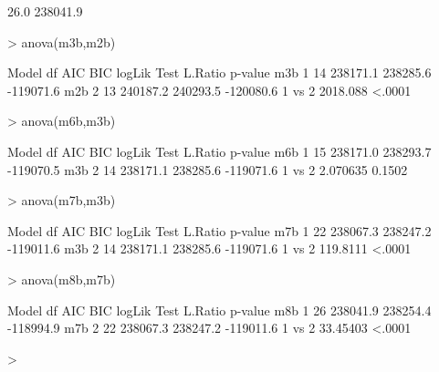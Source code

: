 \documentclass[11pt]{article}
\begin{document}
\begin{Schunk}
\begin{Soutput}
[1]     26.0 238041.9
\end{Soutput}
\begin{Sinput}
> anova(m3b,m2b)
\end{Sinput}
\begin{Soutput}
    Model df      AIC      BIC    logLik   Test  L.Ratio p-value
m3b     1 14 238171.1 238285.6 -119071.6                        
m2b     2 13 240187.2 240293.5 -120080.6 1 vs 2 2018.088  <.0001
\end{Soutput}
\begin{Sinput}
> anova(m6b,m3b)
\end{Sinput}
\begin{Soutput}
    Model df      AIC      BIC    logLik   Test  L.Ratio p-value
m6b     1 15 238171.0 238293.7 -119070.5                        
m3b     2 14 238171.1 238285.6 -119071.6 1 vs 2 2.070635  0.1502
\end{Soutput}
\begin{Sinput}
> anova(m7b,m3b)
\end{Sinput}
\begin{Soutput}
    Model df      AIC      BIC    logLik   Test  L.Ratio p-value
m7b     1 22 238067.3 238247.2 -119011.6                        
m3b     2 14 238171.1 238285.6 -119071.6 1 vs 2 119.8111  <.0001
\end{Soutput}
\begin{Sinput}
> anova(m8b,m7b)
\end{Sinput}
\begin{Soutput}
    Model df      AIC      BIC    logLik   Test  L.Ratio p-value
m8b     1 26 238041.9 238254.4 -118994.9                        
m7b     2 22 238067.3 238247.2 -119011.6 1 vs 2 33.45403  <.0001
\end{Soutput}
\begin{Sinput}
> 
\end{Sinput}
\end{Schunk}
\end{document}
